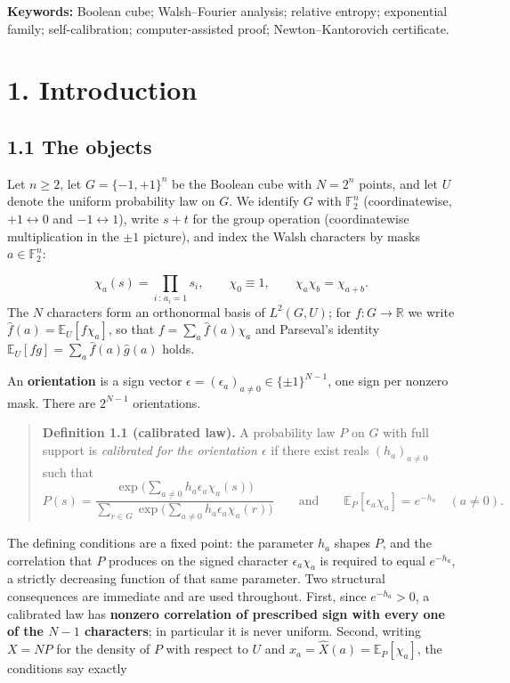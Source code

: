 \documentclass[11pt]{article}
\begin{document}
\textbf{Keywords:} Boolean cube; Walsh--Fourier analysis; relative entropy; exponential family; self-calibration; computer-assisted proof; Newton--Kantorovich certificate.

\section*{1. Introduction}
\subsection*{1.1 The objects}
Let $n \ge 2$, let $G = \{-1,+1\}^n$ be the Boolean cube with $N = 2^n$ points, and let $U$ denote the uniform probability law on $G$.  We identify $G$ with $\mathbb{F}_2^n$ (coordinatewise, $+1 \leftrightarrow 0$ and $-1 \leftrightarrow 1$), write $s + t$ for the group operation (coordinatewise multiplication in the $\pm1$ picture), and index the Walsh characters by masks $a \in \mathbb{F}_2^n$:

\[
\chi_a(s) = \prod_{i \,:\, a_i = 1} s_i, \qquad
\chi_0 \equiv 1, \qquad
\chi_a \chi_b = \chi_{a+b}.
\]
The $N$ characters form an orthonormal basis of $L^2(G, U)$; for $f : G \to \mathbb{R}$ we write $\widehat f(a) = \mathbb{E}_U[f \chi_a]$, so that $f = \sum_a \widehat f(a) \chi_a$ and Parseval's identity $\mathbb{E}_U[f g] = \sum_a \widehat f(a) \widehat g(a)$ holds.

An \textbf{orientation} is a sign vector $\epsilon = (\epsilon_a)_{a \ne 0} \in \{\pm1\}^{N-1}$, one sign per nonzero mask.  There are $2^{N-1}$ orientations.

\begin{quote}
\textbf{Definition 1.1 (calibrated law).}  A probability law $P$ on $G$ with full support is \emph{calibrated for the orientation $\epsilon$} if there exist reals $(h_a)_{a \ne 0}$ such that
\[
P(s) = \frac{\exp\big(\sum_{a\ne0} h_a \epsilon_a \chi_a(s)\big)}
{\sum_{r \in G} \exp\big(\sum_{a\ne0} h_a \epsilon_a \chi_a(r)\big)}
\qquad \text{and} \qquad
\mathbb{E}_P[\epsilon_a \chi_a] = e^{-h_a} \quad (a \ne 0).
\]
\end{quote}
The defining conditions are a fixed point: the parameter $h_a$ shapes $P$, and the correlation that $P$ produces on the signed character $\epsilon_a\chi_a$ is required to equal $e^{-h_a}$, a strictly decreasing function of that same parameter.  Two structural consequences are immediate and are used throughout.  First, since $e^{-h_a} > 0$, a calibrated law has \textbf{nonzero correlation of prescribed sign with every one of the $N-1$ characters}; in particular it is never uniform.  Second, writing $X = N P$ for the density of $P$ with respect to $U$ and $x_a = \widehat X(a) = \mathbb{E}_P[\chi_a]$, the conditions say exactly
\end{document}
